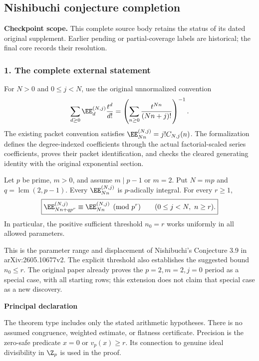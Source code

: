 \clearpage\subsection{Nishibuchi conjecture completion}\label{app:sup11}
\noindent\textbf{Checkpoint scope.} This complete source body retains the status of its dated original supplement. Earlier pending or partial-coverage labels are historical; the final core records their resolution.\par\medskip
\subsubsection*{1. The complete external statement}
For $N>0$ and $0\le j<N$, use the original unnormalized convention
\[
 \sum_{d\ge0}\EE_d^{(N,j)}\frac{t^d}{d!}
 =\left(\sum_{n\ge0}\frac{t^{Nn}}{(Nn+j)!}\right)^{-1}.
\]
The existing packet convention satisfies
$\EE_{Nn}^{(N,j)}=j!C_{N,j}(n)$. The formalization defines the degree-indexed coefficients through the actual factorial-scaled series coefficients, proves their packet identification, and checks the cleared generating identity with the original exponential section.

\begin{theorem}
Let $p$ be prime, $m>0$, and assume $m\mid p-1$ or $m=2$. Put $N=mp$ and $q=\operatorname{lcm}(2,p-1)$. Every $\EE_{Nn}^{(N,j)}$ is $p$-adically integral. For every $r\ge1$,
\[
\boxed{\EE_{Nn+qp^r}^{(N,j)}\equiv\EE_{Nn}^{(N,j)}\pmod{p^r}
       \qquad(0\le j<N,\ n\ge r).}
\]
In particular, the positive sufficient threshold $n_0=r$ works uniformly in all allowed parameters.
\end{theorem}

This is the parameter range and displacement of Nishibuchi's Conjecture 3.9 in arXiv:2605.10677v2. The explicit threshold also establishes the suggested bound $n_0\le r$. The original paper already proves the $p=2,m=2,j=0$ period as a special case, with all starting rows; this extension does not claim that special case as a new discovery.

\textbf{Principal declaration}\par
{}

The theorem type includes only the stated arithmetic hypotheses. There is no assumed congruence, weighted estimate, or flatness certificate. Precision is the zero-safe predicate $x=0$ or $v_p(x)\ge r$. Its connection to genuine ideal divisibility in $\Z_p$ is used in the proof.

